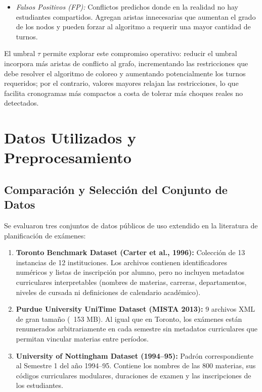 \documentclass[11pt,a4paper]{article}
\begin{document}
\begin{enumerate}
\begin{itemize}
        \item \textit{Falsos Positivos (FP):} Conflictos predichos donde en la realidad no hay estudiantes compartidos. Agregan aristas innecesarias que aumentan el grado de los nodos y pueden forzar al algoritmo a requerir una mayor cantidad de turnos.
    \end{itemize}
    El umbral $\tau$ permite explorar este compromiso operativo: reducir el umbral incorpora más aristas de conflicto al grafo, incrementando las restricciones que debe resolver el algoritmo de coloreo y aumentando potencialmente los turnos requeridos; por el contrario, valores mayores relajan las restricciones, lo que facilita cronogramas más compactos a costa de tolerar más choques reales no detectados.
\end{enumerate}

\section{Datos Utilizados y Preprocesamiento}

\subsection{Comparación y Selección del Conjunto de Datos}
Se evaluaron tres conjuntos de datos públicos de uso extendido en la literatura de planificación de exámenes:
\begin{enumerate}
    \item \textbf{Toronto Benchmark Dataset (Carter et al., 1996):} Colección de 13 instancias de 12 instituciones. Los archivos contienen identificadores numéricos y listas de inscripción por alumno, pero no incluyen metadatos curriculares interpretables (nombres de materias, carreras, departamentos, niveles de cursada ni definiciones de calendario académico).
    \item \textbf{Purdue University UniTime Dataset (MISTA 2013):} 9 archivos XML de gran tamaño (~153 MB). Al igual que en Toronto, los exámenes están renumerados arbitrariamente en cada semestre sin metadatos curriculares que permitan vincular materias entre períodos.
    \item \textbf{University of Nottingham Dataset (1994--95):} Padrón correspondiente al Semestre 1 del año 1994--95. Contiene los nombres de las 800 materias, sus códigos curriculares modulares, duraciones de examen y las inscripciones de los estudiantes.
\end{enumerate}
\end{document}
